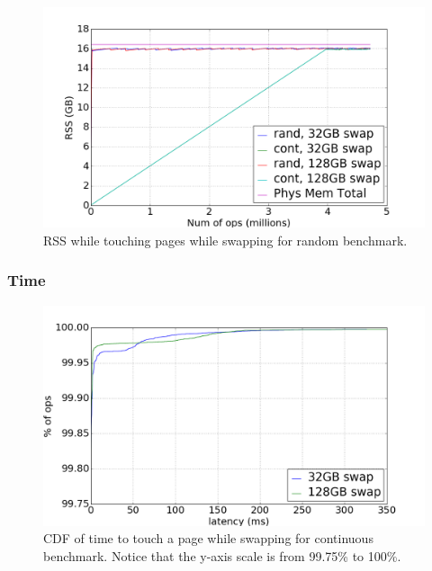 \documentclass[twocolumn,11pt]{article}
\begin{document}
\begin{figure}[t]
    \includegraphics[width=\columnwidth]{figures/swap_rss}
    \caption{RSS while touching pages while swapping for random benchmark.}
    \label{swap_rss}
\end{figure}

\subsubsection{Time}

\begin{figure}[t]
    \includegraphics[width=\columnwidth]{figures/swap_touch_time_cont_cdf}
    \caption{CDF of time to touch a page while swapping for continuous
    benchmark. Notice that the y-axis scale is from 99.75\% to 100\%.
    \label{fig:swap_time_cont_cdf}}
\end{figure}
\end{document}
